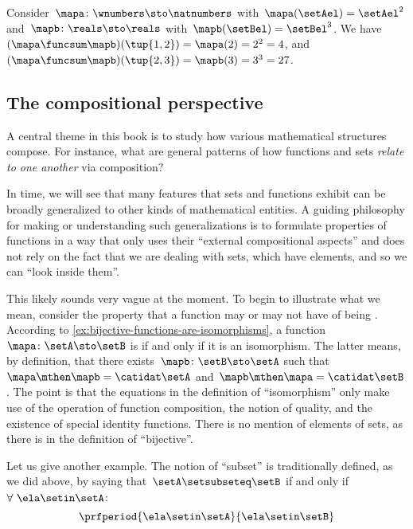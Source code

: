 \begin{example}
    Consider~$\mapa\colon \wnumbers \sto \natnumbers$ with~$\mapa(\setAel)=\setAel^2$ and~$\mapb\colon \reals \sto \reals$ with~$\mapb(\setBel)=\setBel^3$.
    We have~$(\mapa \funcsum \mapb)(\tup{1,2})=\mapa(2)=2^2=4$, and~$(\mapa \funcsum \mapb)(\tup{2,3})=\mapb(3)=3^3 = 27$.
\end{example}

\subsection{The compositional perspective}

A central theme in this book is to study how various mathematical structures compose.
For instance, what are general patterns of how functions and sets \emph{relate to one another} via composition?

In time, we will see that many features that sets and functions exhibit can be broadly generalized to other kinds of mathematical entities.
A guiding philosophy for making or understanding such generalizations is to formulate properties of functions in a way that only uses their ``external compositional aspects'' and does not rely on the fact that we are dealing with sets, which have elements, and so we can ``look inside them''.

This likely sounds very vague at the moment.
To begin to illustrate what we mean, consider the property that a function may or may not have of being .
According to \cref{ex:bijective-functions-are-isomorphisms}, a function~$\mapa\colon \setA \sto \setB$ is  if and only if it is an isomorphism.
The latter means, by definition, that there exists~$\mapb \colon \setB \sto \setA$ such that~$\mapa \mthen \mapb = \catidat\setA$ and~$\mapb \mthen \mapa = \catidat\setB$.
The point is that the equations in the definition of ``isomorphism'' only make use of the operation of function composition, the notion of quality, and the existence of special identity functions.
There is no mention of elements of sets, as there is in the definition of ``bijective''.

Let us give another example.
The notion of ``subset'' is traditionally defined, as we did above, by saying that~$\setA \setsubseteq \setB$ if and only if~$\forall \ \ela \setin\setA$:
\begin{equation}
    \prfperiod{
        \ela \setin\setA
    }{
        \ela \setin\setB
    }
\end{equation}

